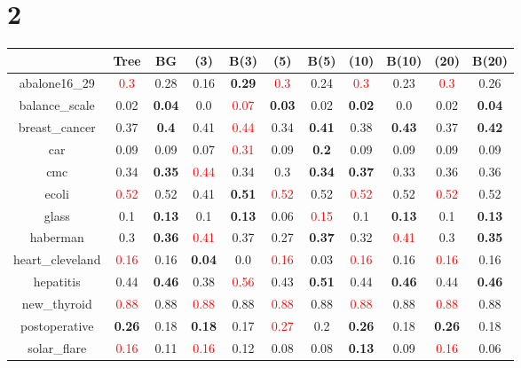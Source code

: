 \documentclass{article}%
\begin{document}
\section*{2}%
\begin{tabular}{c|cccccccccc}%
\hline%
&Tree&BG&(3)&B(3)&(5)&B(5)&(10)&B(10)&(20)&B(20)\\%
\hline%
abalone16\_29&\textcolor{red}{ 
0.3
}&0.28&0.16&\textbf{0.29}&\textcolor{red}{ 
0.3
}&0.24&\textcolor{red}{ 
0.3
}&0.23&\textcolor{red}{ 
0.3
}&0.26\\%
\hline%
balance\_scale&0.02&\textbf{0.04}&0.0&\textcolor{red}{ 
0.07
}&\textbf{0.03}&0.02&\textbf{0.02}&0.0&0.02&\textbf{0.04}\\%
\hline%
breast\_cancer&0.37&\textbf{0.4}&0.41&\textcolor{red}{ 
0.44
}&0.34&\textbf{0.41}&0.38&\textbf{0.43}&0.37&\textbf{0.42}\\%
\hline%
car&0.09&0.09&0.07&\textcolor{red}{ 
0.31
}&0.09&\textbf{0.2}&0.09&0.09&0.09&0.09\\%
\hline%
cmc&0.34&\textbf{0.35}&\textcolor{red}{ 
0.44
}&0.34&0.3&\textbf{0.34}&\textbf{0.37}&0.33&0.36&0.36\\%
\hline%
ecoli&\textcolor{red}{ 
0.52
}&0.52&0.41&\textbf{0.51}&\textcolor{red}{ 
0.52
}&0.52&\textcolor{red}{ 
0.52
}&0.52&\textcolor{red}{ 
0.52
}&0.52\\%
\hline%
glass&0.1&\textbf{0.13}&0.1&\textbf{0.13}&0.06&\textcolor{red}{ 
0.15
}&0.1&\textbf{0.13}&0.1&\textbf{0.13}\\%
\hline%
haberman&0.3&\textbf{0.36}&\textcolor{red}{ 
0.41
}&0.37&0.27&\textbf{0.37}&0.32&\textcolor{red}{ 
0.41
}&0.3&\textbf{0.35}\\%
\hline%
heart\_cleveland&\textcolor{red}{ 
0.16
}&0.16&\textbf{0.04}&0.0&\textcolor{red}{ 
0.16
}&0.03&\textcolor{red}{ 
0.16
}&0.16&\textcolor{red}{ 
0.16
}&0.16\\%
\hline%
hepatitis&0.44&\textbf{0.46}&0.38&\textcolor{red}{ 
0.56
}&0.43&\textbf{0.51}&0.44&\textbf{0.46}&0.44&\textbf{0.46}\\%
\hline%
new\_thyroid&\textcolor{red}{ 
0.88
}&0.88&\textcolor{red}{ 
0.88
}&0.88&\textcolor{red}{ 
0.88
}&0.88&\textcolor{red}{ 
0.88
}&0.88&\textcolor{red}{ 
0.88
}&0.88\\%
\hline%
postoperative&\textbf{0.26}&0.18&\textbf{0.18}&0.17&\textcolor{red}{ 
0.27
}&0.2&\textbf{0.26}&0.18&\textbf{0.26}&0.18\\%
\hline%
solar\_flare&\textcolor{red}{ 
0.16
}&0.11&\textcolor{red}{ 
0.16
}&0.12&0.08&0.08&\textbf{0.13}&0.09&\textcolor{red}{ 
0.16
}&0.06\\%

\end{tabular}
\end{document}
